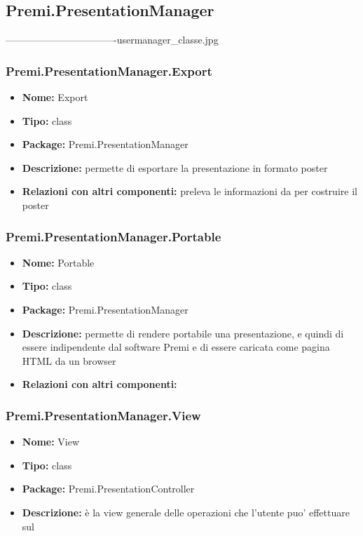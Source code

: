 \subsection{Premi.PresentationManager}
----------------------------------usermanager_classe.jpg
\subsubsection{Premi.PresentationManager.Export}
\begin{itemize}
  \item \textbf{Nome:} Export 
  \item \textbf{Tipo:} class
  \item \textbf{Package:} Premi.PresentationManager
  \item \textbf{Descrizione:} permette di esportare la presentazione in formato poster
  \item \textbf{Relazioni con altri componenti:} preleva le informazioni da  per costruire il poster
\end{itemize}
\subsubsection{Premi.PresentationManager.Portable}
\begin{itemize}
  \item \textbf{Nome:} Portable
  \item \textbf{Tipo:} class
  \item \textbf{Package:} Premi.PresentationManager
  \item \textbf{Descrizione:} permette di rendere portabile una presentazione, e quindi di essere indipendente dal software Premi e di essere caricata come pagina HTML da un browser
  \item \textbf{Relazioni con altri componenti:} 
\end{itemize}
\subsubsection{Premi.PresentationManager.View}
\begin{itemize}
  \item \textbf{Nome:} View
  \item \textbf{Tipo:} class
  \item \textbf{Package:} Premi.PresentationController
  \item \textbf{Descrizione:} è la view generale delle operazioni che l'utente puo' effettuare sul
\end{itemize}
